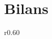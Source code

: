 \chapter{Bilans}
\begin{wrapfigure}{r}{0.60\textwidth}
\vspace{-25px}
\hspace{-30px}
\begin{minipage}{0.67\textwidth}
\minitoc
\end{minipage}
\end{wrapfigure}




	
	

